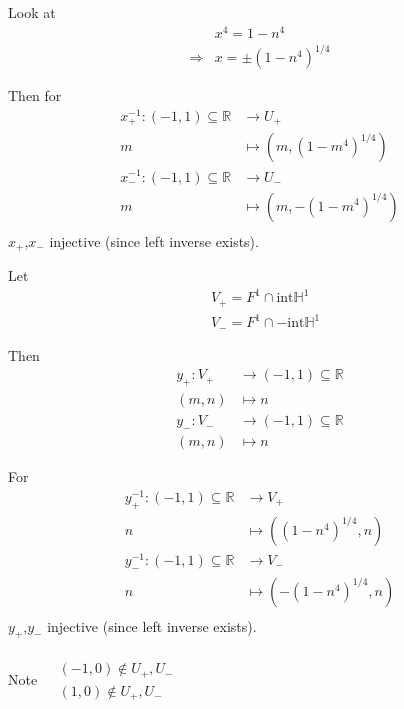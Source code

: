Look at 
\[
\begin{aligned}
  & x^4 = 1 - n^4 \\ 
  \Longrightarrow & x = \pm ( 1 - n^4)^{1/4}
\end{aligned}
\]

Then for 
\[
\begin{aligned}
  x_+^{-1}: (-1,1) \subseteq \mathbb{R} & \to U_+ \\ 
  m & \mapsto (m,(1-m^4)^{1/4}) \\
  x_-^{-1}: (-1,1) \subseteq \mathbb{R} & \to U_- \\ 
  m & \mapsto (m,-(1-m^4)^{1/4}) \\
\end{aligned}
\]
$x_+$,$x_-$ injective (since left inverse exists).  



\solutionhead{}

Let 
\[
\begin{aligned}
  & V_+ = F^1 \cap \text{int}\mathbb{H}^1 \\
  & V_- = F^1 \cap -\text{int}\mathbb{H}^1
\end{aligned}
\]

Then
\[
\begin{aligned}
  y_+:  V_+ & \to  (-1,1) \subseteq \mathbb{R} \\ 
  (m,n) & \mapsto n \\
  y_-: V_-  & \to  (-1,1) \subseteq \mathbb{R}  \\ 
  (m,n) & \mapsto n
\end{aligned}
\]

\solutionhead{}


For 
\[
\begin{aligned}
  y_+^{-1}: (-1,1) \subseteq \mathbb{R} & \to V_+ \\ 
  n & \mapsto ((1-n^4)^{1/4},n) \\
  y_-^{-1}: (-1,1) \subseteq \mathbb{R} & \to V_- \\ 
  n & \mapsto (-(1-n^4)^{1/4},n) \\
\end{aligned}
\]
$y_+$,$y_-$ injective (since left inverse exists).  



Note $\begin{aligned} & \quad \\ 
  & (-1,0) \notin U_+,U_- \\
  & (1,0) \notin U_+,U_- \\
\end{aligned}$

